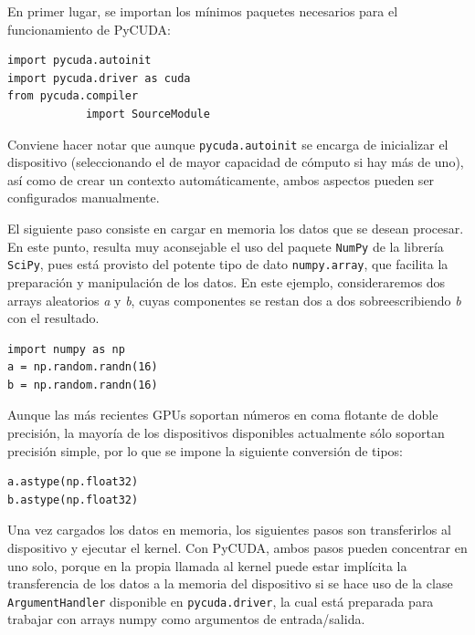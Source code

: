 \documentclass[twocolumn,twoside]{Jornadas}
\begin{document}

En primer lugar, se importan los mínimos paquetes necesarios para el funcionamiento de PyCUDA:

\begin{lstlisting}
import pycuda.autoinit
import pycuda.driver as cuda
from pycuda.compiler 
            import SourceModule
\end{lstlisting}

Conviene hacer notar que aunque {\tt pycuda.autoinit} se encarga de inicializar el dispositivo (seleccionando el de mayor capacidad de cómputo si hay más de uno), así como de crear un contexto automáticamente, ambos aspectos pueden ser configurados manualmente.


El siguiente paso consiste en cargar en memoria los datos que se desean procesar. En este punto, resulta muy aconsejable el uso del paquete {\tt NumPy} de la librería {\tt SciPy}, pues está provisto del potente tipo de dato {\tt numpy.array}, que facilita la preparación y manipulación de los datos. En este ejemplo, consideraremos dos arrays aleatorios \emph{a} y \emph{b}, cuyas componentes se restan dos a dos sobreescribiendo \emph{b} con el resultado.


\begin{lstlisting}
import numpy as np
a = np.random.randn(16)
b = np.random.randn(16)
\end{lstlisting}

Aunque las más recientes GPUs soportan números en coma flotante de doble precisión, la mayoría de los dispositivos disponibles actualmente sólo soportan precisión simple, por lo que se impone la siguiente conversión de tipos:

\begin{lstlisting}
a.astype(np.float32)
b.astype(np.float32)
\end{lstlisting}

Una vez cargados los datos en memoria, los siguientes pasos son transferirlos al dispositivo y ejecutar el kernel. Con PyCUDA, ambos pasos pueden concentrar en uno solo, porque en la propia llamada al kernel puede estar implícita la transferencia de los datos a la memoria del dispositivo si se hace uso de la clase {\tt ArgumentHandler} disponible en {\tt pycuda.driver}, la cual está preparada para trabajar con arrays numpy como argumentos de entrada/salida.
\end{document}
